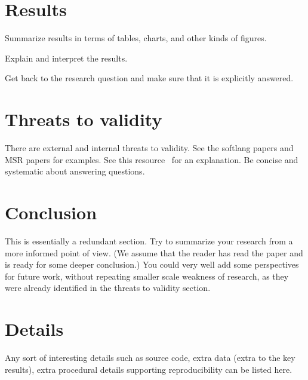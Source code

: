 \documentclass{llncs}
\begin{document}

\section{Results}

\noindent
Summarize results in terms of tables, charts, and other kinds of
figures.

Explain and interpret the results.

Get back to the research question and make sure that it is explicitly answered.


\section{Threats to validity}

There are external and internal threats to validity. See the softlang
papers and MSR papers for examples. See this resource~\cite{Michael04}
for an explanation. Be concise and systematic about answering
questions.


\section{Conclusion}

This is essentially a redundant section. Try to summarize your
research from a more informed point of view. (We assume that the
reader has read the paper and is ready for some deeper conclusion.)
You could very well add some perspectives for future work, without
repeating smaller scale weakness of research, as they were already
identified in the threats to validity section.


\appendix

\section{Details}
\label{S:details}

Any sort of interesting details such as source code, extra data (extra
to the key results), extra procedural details supporting
reproducibility can be listed here.





\end{document}
